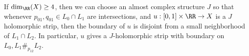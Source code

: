 

If $\dim_\RR(X)\geq 4$, then we can choose an almost complex structure $J$ so that whenever $p_{01}, q_{01}\in L_0\cap L_1$ are intersections, and $u: [0,1]\times \RR\to X$ is a $J$ holomorphic strip, then the boundary of $u$ is disjoint from a small neighborhood of $L_1\cap L_2$. In particular, $u$ gives a $J$-holomorphic strip with boundary on $L_0, L_1\#_{p_{12}} L_2$.
